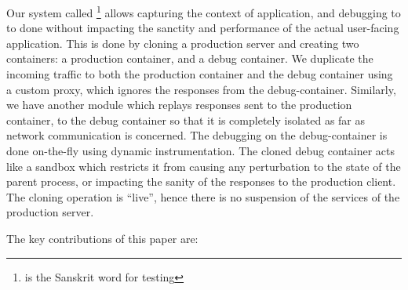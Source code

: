 \noindent
 Our system called \parikshan\footnote{\parikshan is the Sanskrit word for testing} allows capturing the context of application, and debugging to to done without impacting the sanctity and performance of the actual user-facing application. 
This is done by cloning a production server and creating two containers: a production container, and a debug container. 
We duplicate the incoming traffic to both the production container and the debug container using a custom proxy, which ignores the responses from the debug-container.
Similarly, we have another module which replays responses sent to the production container, to the debug container so that it is completely isolated as far as network communication is concerned. 
The debugging on the debug-container is done on-the-fly using dynamic instrumentation. %
The cloned debug container acts like a sandbox which restricts it from causing any perturbation to the state of the parent process, or impacting the sanity of the responses to the production client. 
The cloning operation is ``live'', hence there is no suspension of the services of the production server.

\noindent
The key contributions of this paper are:

